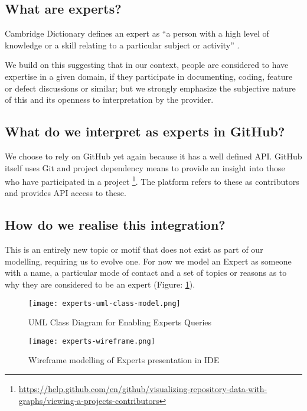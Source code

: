
\subsection{What are experts?}

Cambridge Dictionary defines an expert as ``a person with a high level of knowledge or a skill relating to a particular subject or activity'' .

We build on this suggesting that in our context, people are considered to have expertise in a given domain, if they participate in documenting, coding, feature or defect discussions or similar; but we strongly emphasize the subjective nature of this and its openness to interpretation by the provider.

\subsection{What do we interpret as experts in GitHub?}

We choose to rely on GitHub yet again because it has a well defined API. GitHub itself uses Git and project dependency means to provide an insight into those who have participated in a project \footnote{\url{https://help.github.com/en/github/visualizing-repository-data-with-graphs/viewing-a-projects-contributors}}. The platform refers to these as contributors and provides API access to these.

\subsection{How do we realise this integration?}

This is an entirely new topic or motif that does not exist as part of our modelling, requiring us to evolve one. For now we model an Expert as someone with a name, a particular mode of contact and a set of topics or reasons as to why they are considered to be an expert (Figure: \ref{fig:expertsUmlClassModel}).

\begin{figure}[h!]
	\centering
	\texttt{[image: experts-uml-class-model.png]}
	\label{fig:expertsUmlClassModel}
	\caption{UML Class Diagram for Enabling Experts Queries}
\end{figure}


\begin{figure}[h!]
	\centering
	\texttt{[image: experts-wireframe.png]}
	\caption{Wireframe modelling of Experts presentation in IDE}
	\label{fig:expertsWireframe}
\end{figure}

